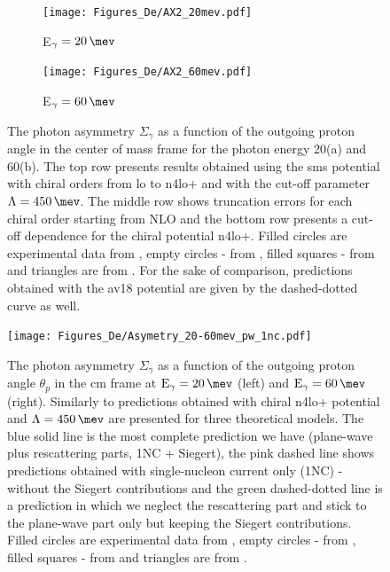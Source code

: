     \begin{figure}[h]
        \centering
        \begin{subfigure}[b]{0.46\textwidth}
            \caption{\small E$_\gamma = \SI{20}{\mev}$}
            \texttt{[image: Figures\_De/AX2\_20mev.pdf]}
            \label{AX_20_vert}
        \end{subfigure}
        \begin{subfigure}[b]{0.46\textwidth}
            \caption{\small E$_\gamma = \SI{60}{\mev}$}
            \texttt{[image: Figures\_De/AX2\_60mev.pdf]}
            \label{AX_60_vert}
        \end{subfigure}
        \caption{The photon asymmetry $\Sigma_\gamma$ 
        as a function of the outgoing proton angle in the center of mass frame 
        for the photon energy \SI{20}{\mev}(a) and \SI{60}{\mev}(b).
        The top row presents results obtained using the \gls{sms} potential
        with chiral orders from \gls{lo} to \gls{n4lo+} and with the cut-off parameter $\Lambda=\SI{450}{\mev}$.
        The middle row shows truncation errors for each 
        chiral order starting from NLO and the
        bottom row presents a cut-off dependence for the chiral potential \gls{n4lo+}.
        Filled circles are experimental data from \cite{KRAUSE1992_asymetry},
        empty circles - from \cite{depascale_asymmetry}, filled squares
        - from \cite{Barannik_asymetry} and triangles are from \cite{Vnukov_asymmetry}.
        For the sake of comparison, predictions obtained with the \gls{av18} potential are
        given by the dashed-dotted curve as well.}
        \label{assymetry}
    \end{figure}


    \begin{figure}[h]
        \begin{center}
        \texttt{[image: Figures\_De/Asymetry\_20-60mev\_pw\_1nc.pdf]}
        \end{center}
        \caption{The photon asymmetry $\Sigma_\gamma$ as a function of the
        outgoing proton angle $\theta_p$ in the \gls{cm} frame at $\text{E}_\gamma = \SI{20}{\mev}$
        (left) and $\text{E}_\gamma = \SI{60}{\mev}$(right).
        Similarly to  predictions obtained with chiral \gls{n4lo+} potential
        and $\Lambda=\SI{450}{\mev}$ are presented for three theoretical models.
        The blue solid line is the most complete prediction we have (plane-wave plus rescattering parts, 1NC + Siegert), the pink dashed line shows predictions obtained with
        single-nucleon current only (1NC) - without the Siegert contributions and the green dashed-dotted line
        is a prediction in which we neglect the rescattering part
        and stick to the plane-wave part only but keeping the Siegert contributions.
        Filled circles are experimental data from \cite{KRAUSE1992_asymetry},
        empty circles - from \cite{depascale_asymmetry}, filled squares
        - from \cite{Barannik_asymetry} and triangles are from \cite{Vnukov_asymmetry}.}
        \label{asymmetry_energy_1NC}
    \end{figure}

